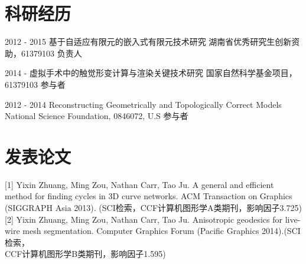 \documentclass[20pt]{article} %
\begin{document}

\section{科研经历}
\job
{2012 - 2015}{}
{基于自适应有限元的嵌入式有限元技术研究}
{湖南省优秀研究生创新资助，61379103}
{负责人}

\job
{2014 - }{}
{虚拟手术中的触觉形变计算与渲染关键技术研究}
{国家自然科学基金项目，61379103}
{参与者}

\job
{2012 - }{2014}
{Reconstructing Geometrically and Topologically Correct Models}
{National Science Foundation, 0846072, U.S}
{参与者}

\section{发表论文}

[1]   Yixin Zhuang, Ming Zou, Nathan Carr, Tao Ju. {A general and efficient method for finding cycles in 3D curve networks}. ACM Transaction on Graphics (SIGGRAPH Asia 2013). (SCI检索，CCF计算机图形学A类期刊，影响因子3.725)\\%


[2] Yixin Zhuang, Ming Zou, Nathan Carr, Tao Ju. {Anisotropic geodesics for live-wire mesh segmentation}. Computer Graphics Forum (Pacific Graphics 2014).(SCI检索，\\CCF计算机图形学B类期刊，影响因子1.595)\\%
\end{document}
